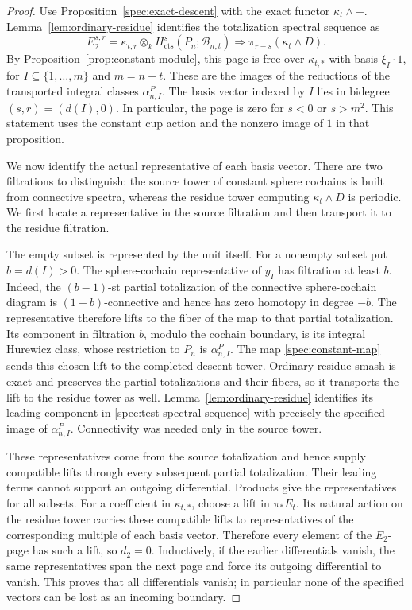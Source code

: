\begin{proof}
Use Proposition~\ref{spec:exact-descent} with the exact functor
\(\kappa_t\wedge-\). Lemma~\ref{lem:ordinary-residue} identifies
the totalization spectral sequence as
\begin{equation}
E_2^{s,r}=\kappa_{t,r}\otimes_k
 H^s_{\mathrm{cts}}(P_n;\mathcal B_{n,t})
\Longrightarrow\pi_{r-s}(\kappa_t\wedge D).
\label{spec:test-spectral-sequence}
\end{equation}
By Proposition~\ref{prop:constant-module}, this page is free over
$\kappa_{t,*}$ with basis $\xi_I\cdot1$, for
$I\subseteq\{1,\ldots,m\}$ and $m=n-t$. These are the images
of the reductions of the transported integral classes
$\alpha^P_{n,I}$.
The basis vector indexed by \(I\) lies in bidegree
\((s,r)=(d(I),0)\). In particular, the page is zero for
\(s<0\) or \(s>m^2\). This statement uses the constant cup action
and the nonzero image of \(1\) in that proposition.

We now identify the actual representative of each basis vector.
There are two filtrations to distinguish: the source tower of
constant sphere cochains is built from connective spectra, whereas
the residue tower computing \(\kappa_t\wedge D\) is periodic.
We first locate a representative in the source filtration and then
transport it to the residue filtration.

The empty subset is represented by the unit itself. For a nonempty
subset put \(b=d(I)>0\). The sphere-cochain representative of
\(y_I\) has filtration at least \(b\). Indeed, the
\((b-1)\)-st partial totalization of the connective sphere-cochain
diagram is \((1-b)\)-connective and hence has zero homotopy in
degree \(-b\). The representative therefore lifts to the fiber
of the map to that partial totalization. Its component in filtration
\(b\), modulo the cochain boundary, is its integral Hurewicz
class, whose restriction to \(P_n\) is \(\alpha^P_{n,I}\).
The map \eqref{spec:constant-map} sends this chosen lift to the
completed descent tower. Ordinary residue smash is exact and
preserves the partial totalizations and their fibers, so it transports
the lift to the residue tower as well. Lemma~\ref{lem:ordinary-residue}
identifies its leading component in
\eqref{spec:test-spectral-sequence} with precisely the specified
image of \(\alpha^P_{n,I}\). Connectivity was needed only in the
source tower.

These representatives come from the source totalization and hence
supply compatible lifts through every subsequent partial
totalization. Their leading terms cannot support an outgoing
differential. Products give the representatives for all subsets. For
a coefficient in \(\kappa_{t,*}\), choose a lift in \(\pi_*E_t\).
Its natural action on the residue tower carries these compatible lifts
to representatives of the corresponding multiple of each basis vector.
Therefore every element of the \(E_2\)-page has such a lift, so
\(d_2=0\). Inductively, if the earlier differentials vanish, the
same representatives span the next page and force its outgoing
differential to vanish. This proves that all differentials vanish;
in particular none of the specified vectors can be lost as an
incoming boundary.


\end{proof}
